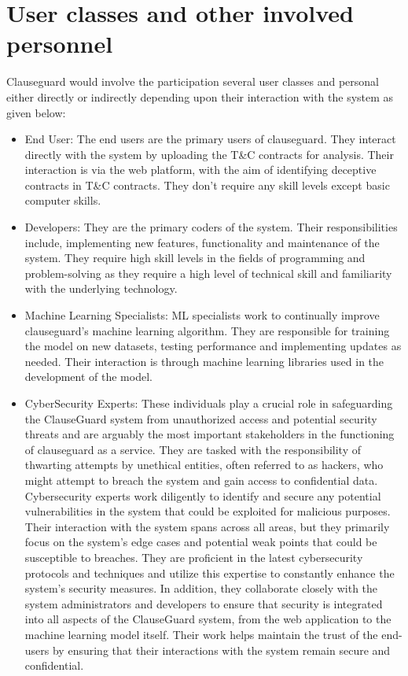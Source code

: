 \section{User classes and other involved personnel \label{Section::User Classes and other involved personnel}}
Clauseguard would involve the participation several user classes and  personal either directly or indirectly depending upon their interaction with the system as given below: 
\begin{itemize}
    \item End User: The end users are the primary users of clauseguard. They interact directly with the system by uploading the T\&C contracts for analysis. Their interaction is via the web platform, with the aim of identifying deceptive contracts in T\&C contracts. They don't require any skill levels except basic computer skills. 
    \item Developers: They are the primary coders of the system. Their responsibilities include, implementing new features, functionality and maintenance of the system. They require high skill levels in the fields of programming and problem-solving as they require a high level of technical skill and familiarity with the underlying technology.
    \item Machine Learning Specialists: ML specialists work to continually improve clauseguard's machine learning algorithm. They are responsible for training the model on new datasets, testing performance and implementing updates as needed. Their interaction is through machine learning libraries used in the development of the model. 
    \item CyberSecurity Experts: These individuals play a crucial role in safeguarding the ClauseGuard system from unauthorized access and potential security threats and are arguably the most important stakeholders in the functioning of clauseguard as a service. They are tasked with the responsibility of thwarting attempts by unethical entities, often referred to as hackers, who might attempt to breach the system and gain access to confidential data. Cybersecurity experts work diligently to identify and secure any potential vulnerabilities in the system that could be exploited for malicious purposes. Their interaction with the system spans across all areas, but they primarily focus on the system's edge cases and potential weak points that could be susceptible to breaches. They are proficient in the latest cybersecurity protocols and techniques and utilize this expertise to constantly enhance the system's security measures. In addition, they collaborate closely with the system administrators and developers to ensure that security is integrated into all aspects of the ClauseGuard system, from the web application to the machine learning model itself. Their work helps maintain the trust of the end-users by ensuring that their interactions with the system remain secure and confidential.

\end{itemize}
